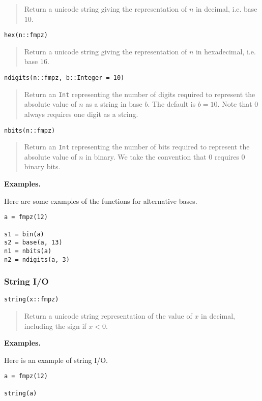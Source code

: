 \documentclass[a4paper,10pt]{article}
\newcommand{\code}{\lstinline}
\newcommand{\desc}[1]{\vspace{-3mm}\begin{quote}#1\end{quote}}
\begin{document}
{{\desc{Return a unicode string giving the representation of $n$ in decimal, i.e. base $10$.}

\begin{lstlisting}
hex(n::fmpz)
\end{lstlisting}

\desc{Return a unicode string giving the representation of $n$ in hexadecimal, i.e. base $16$.}

\begin{lstlisting}
ndigits(n::fmpz, b::Integer = 10)
\end{lstlisting}

\desc{Return an \code{Int} representing the number of digits required to represent the
absolute value of $n$ as a string in base $b$. The default is $b = 10$. Note that $0$
always requires one digit as a string.}

\begin{lstlisting}
nbits(n::fmpz)
\end{lstlisting}

\desc{Return an \code{Int} representing the number of bits required to represent the
absolute value of $n$ in binary. We take the convention that $0$ requires $0$ binary 
bits.}

\textbf{Examples.}

Here are some examples of the functions for alternative bases.

\begin{lstlisting}
a = fmpz(12)

s1 = bin(a)
s2 = base(a, 13)
n1 = nbits(a)
n2 = ndigits(a, 3)
\end{lstlisting}

\subsubsection{String I/O}

\begin{lstlisting}
string(x::fmpz)
\end{lstlisting}

\desc{Return a unicode string representation of the value of $x$ in decimal, including the sign
if $x < 0$.}

\textbf{Examples.}

Here is an example of string I/O.

\begin{lstlisting}
a = fmpz(12)

string(a)
\end{lstlisting}

}}
\end{document}
